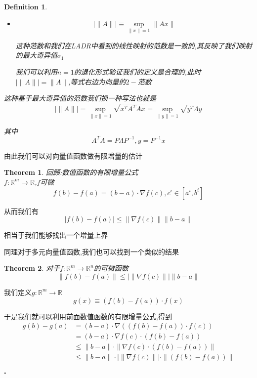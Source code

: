 \documentclass[11pt,hyperref,a4paper,UTF8]{ctexart}
\newtheorem{theorem}{Theorem}[subsection]
\newtheorem{definition}{Definition}[subsection]
\newenvironment{cproof}{%
\heiti{证明}\kaishu
}{%
  \hfill $\square$
  \par\bigskip
}
\newcommand{\RR}{\mathbb{R}}
\newcommand{\parameter}[1]{\left(#1\right)}
\begin{document}
\begin{CJK}{UTF8}{gkai}
\begin{definition}
\begin{itemize}
    这种类似于$2-$范数的形式本质上没有考虑其形式,将其完全当作一个向量来看

    \item \[|\|A \|| \equiv \sup_{\|x\| = 1}\|Ax\|\]

    这种范数和我们在LADR中看到的线性映射的范数是一致的,其反映了我们映射的最大奇异值$\sigma_1$

    我们可以利用$n = 1$的退化形式验证我们的定义是合理的,此时$|\|A \|| = \|A\|$,等式右边为向量的$2-$范数
\end{itemize}

这种基于最大奇异值的范数我们换一种写法也就是
\[|\|A\|| = \sup_{\|x\| = 1}\sqrt{x^T A^T A x} = \sup_{\|y\| = 1} \sqrt{y^T \varLambda y}\]

其中
\[A^T A = P \varLambda P^{-1}, y = P^{-1}x\]
\end{definition}


由此我们可以对向量值函数做有限增量的估计

\begin{theorem}
  回顾:数值函数的有限增量公式\\

  $f : \RR^m \to \RR$,$f$可微
  \[f(b) - f(a) = (b - a) \cdot \nabla f(c), c^i \in [a^i,b^i]\]
\end{theorem}

从而我们有
\[|f(b) - f(a)| \leq \|\nabla f(c)\| \|b - a\|\]

相当于我们能够找出一个增量上界

同理对于多元向量值函数,我们也可以找到一个类似的结果
\begin{theorem}
  对于$f: \RR^m \to \RR^n$的可微函数
  \[\|f(b) - f(a)\| \leq |\| \nabla f(c)\|| \|b - a\|\]
\end{theorem}

\begin{cproof}
  我们定义$g: \RR^m \to \RR$
  \[g(x) \equiv (f(b) - f(a))\cdot f(x)\]

  于是我们就可以利用前面数值函数的有限增量公式,得到
  \[
  \begin{aligned}
    g(b) -g(a) &= (b - a) \cdot \nabla \parameter{(f(b) - f(a))\cdot f(c)} \\
    &= (b - a) \cdot \nabla f(c) \cdot (f(b) - f(a))\\
    &\leq \|b - a\|\cdot \| \nabla f(c) \cdot (f(b) - f(a))\|\\
    &\leq \|b - a\| \cdot|\| \nabla f(c)\||\cdot \|(f(b) - f(a))\|\\
  \end{aligned}  
  \]


\end{cproof}
\end{CJK}
\end{document}
